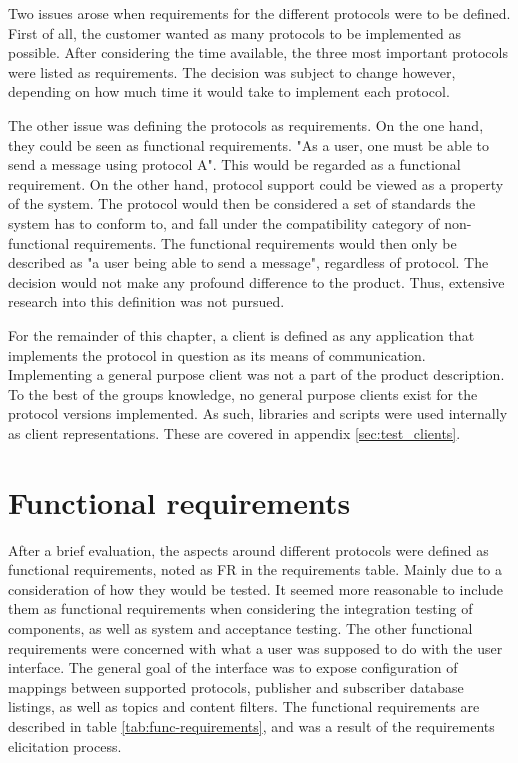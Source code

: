 Two issues arose when requirements for the different protocols were to be defined. First of all, the customer wanted as many protocols to be implemented as possible. After considering the time available, the three most important protocols were listed as requirements. The decision was subject to change however, depending on how much time it would take to implement each protocol.

The other issue was defining the protocols as requirements. On the one hand, they could be seen as functional requirements. "As a user, one must be able to send a message using protocol A". This would be regarded as a functional requirement. On the other hand, protocol support could be viewed as a property of the system. The protocol would then be considered a set of standards the system has to conform to, and fall under the compatibility category of non-functional requirements. The functional requirements would then only be described as "a user being able to send a message", regardless of protocol. The decision would not make any profound difference to the product. Thus, extensive research into this definition was not pursued.

For the remainder of this chapter, a client is defined as any application that implements the protocol in question as its means of communication. Implementing a general purpose client was not a part of the product description. To the best of the groups knowledge, no general purpose clients exist for the protocol versions implemented. As such, libraries and scripts were used internally as client representations. These are covered in appendix \ref{sec:test_clients}.

\section{Functional requirements}
\label{sec:requirements_engineering-functional_requirements}

After a brief evaluation, the aspects around different protocols were defined as functional requirements, noted as FR in the requirements table. Mainly due to a consideration of how they would be tested. It seemed more reasonable to include them as functional requirements when considering the integration testing of components, as well as system and acceptance testing. The other functional requirements were concerned with what a user was supposed to do with the user interface. The general goal of the interface was to expose configuration of mappings between supported protocols, publisher and subscriber database listings, as well as topics and content filters. The functional requirements are described in table \ref{tab:func-requirements}, and was a result of the requirements elicitation process.

